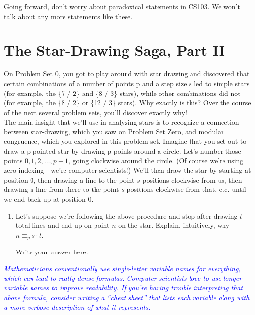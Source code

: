 \documentclass{article}
\renewcommand{\(}{\left(}
\renewcommand{\)}{\right)}
\newcommand{\annotate}[1]{\textit{\textcolor{blue}{#1}}}
\theoremstyle{plain}
\theoremstyle{plain}
\theoremstyle{definition}
\begin{document}
Going forward, don't worry about paradoxical statements in CS103.
We won't talk about any more statements like these.
\smiley

\section{The Star-Drawing Saga, Part II}

On Problem Set 0, you got to play around with star drawing and discovered that certain combinations of a number of points p and a step size s led to simple stars (for example, the \{7 / 2\} and \{8 / 3\} stars), while other combinations did not (for example, the \{8 / 2\} or \{12 / 3\} stars). Why exactly is this? Over the course of the next several problem sets, you'll discover exactly why! \\

The main insight that we'll use in analyzing stars is to recognize a connection between star-drawing, which you saw on Problem Set Zero, and modular congruence, which you explored in this problem set. Imagine that you set out to draw a p-pointed star by drawing p points around a circle. Let's number those points $0, 1, 2, \dots, p - 1$, going clockwise around the circle. (Of course we're using zero-indexing - we're computer scientists!) We'll then draw the star by starting at position 0, then drawing a line to the point $s$ positions clockwise from us, then drawing a line from there to the point $s$ positions clockwise from that, etc. until we end back up at position 0. 

\begin{enumerate}[label*=\roman*.,ref=\roman*]
    \item Let's suppose we're following the above procedure and stop after drawing $t$ total lines and end up on point $n$ on the star. Explain, intuitively, why $n \equiv_p s \cdot t$.
    
    \begin{shaded}
    Write your answer here.
    \end{shaded}
    
\end{enumerate}

\annotate{Mathematicians conventionally use single-letter variable names for everything, which can lead to really dense formulas. Computer scientists love to use longer variable names to improve readability. If you're having trouble interpreting that above formula, consider writing a ``cheat sheet'' that lists each variable along with a more verbose description of what it represents.} \\
\end{document}

